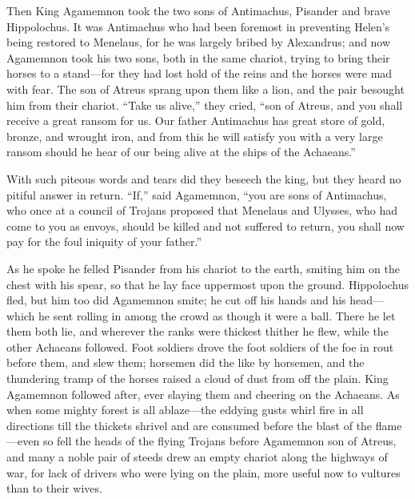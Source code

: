 Then King Agamemnon took the two sons of Antimachus, Pisander and brave
Hippolochus. It was Antimachus who had been foremost in preventing Helen’s
being restored to Menelaus, for he was largely bribed by Alexandrus; and
now Agamemnon took his two sons, both in the same chariot, trying to bring
their horses to a stand—for they had lost hold of the reins and the
horses were mad with fear. The son of Atreus sprang upon them like a lion,
and the pair besought him from their chariot. “Take us alive,” they cried,
“son of Atreus, and you shall receive a great ransom for us. Our father
Antimachus has great store of gold, bronze, and wrought iron, and from
this he will satisfy you with a very large ransom should he hear of our
being alive at the ships of the Achaeans.”

With such piteous words and tears did they beseech the king, but they
heard no pitiful answer in return. “If,” said Agamemnon, “you are sons of
Antimachus, who once at a council of Trojans proposed that Menelaus and
Ulysses, who had come to you as envoys, should be killed and not suffered
to return, you shall now pay for the foul iniquity of your father.”

As he spoke he felled Pisander from his chariot to the earth, smiting him
on the chest with his spear, so that he lay face uppermost upon the
ground. Hippolochus fled, but him too did Agamemnon smite; he cut off his
hands and his head—which he sent rolling in among the crowd as
though it were a ball. There he let them both lie, and wherever the ranks
were thickest thither he flew, while the other Achaeans followed. Foot
soldiers drove the foot soldiers of the foe in rout before them, and slew
them; horsemen did the like by horsemen, and the thundering tramp of the
horses raised a cloud of dust from off the plain. King Agamemnon followed
after, ever slaying them and cheering on the Achaeans. As when some mighty
forest is all ablaze—the eddying gusts whirl fire in all directions
till the thickets shrivel and are consumed before the blast of the flame—even
so fell the heads of the flying Trojans before Agamemnon son of Atreus,
and many a noble pair of steeds drew an empty chariot along the highways
of war, for lack of drivers who were lying on the plain, more useful now
to vultures than to their wives.


